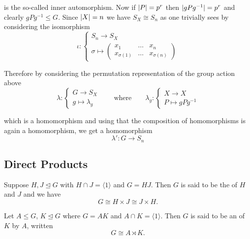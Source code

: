 	\noindent is the so-called inner automorphism. Now if $\abs[0]{P} = p^r$ then $\abs[0]{gPg^{-1}} = p^r$ and clearly $gPg^{-1} \leq G$. Since $\abs[0]{X} = n$ we have $S_X \cong S_n$ as one trivially sees by considering the isomorphism 
	\begin{equation}
		\iota:\begin{cases} S_n \to S_X\\
			\sigma \mapsto \begin{pmatrix}x_1 & \dots & x_n\\
				x_{\sigma(1)} & \dots & x_{\sigma(n)}
			\end{pmatrix}
		\end{cases}
	\end{equation}

	Therefore by considering the permutation representation of the group action above 
	\begin{equation}
		\lambda:\begin{cases}
			G \to S_X\\
			g \mapsto \lambda_g
		\end{cases}
		\qquad
		\text{where} 
		\qquad 
		\lambda_g:\begin{cases}
			X \to X\\
			P \mapsto gPg^{-1}
		\end{cases}
	\end{equation}

	\noindent which is a homomorphism and using that the composition of homomorphisms is again a homomorphism, we get a homomorphism 
	\begin{equation}
		\lambda': G \to S_n
	\end{equation}

\subsection{Direct Products}

\begin{definition}
	Suppose $H,J \unlhd G$ with $H \cap J = \langle 1 \rangle$ and $G = HJ$. Then $G$ is said to be the  of $H$ and $J$ and we have 
	\begin{equation}
		G \cong H \times J \cong J \times H.
	\end{equation}
\end{definition}

\begin{definition}
	Let $A \leq G$, $K \unlhd G$ where $G = AK$ and $A \cap K = \langle 1 \rangle$. Then $G$ is said to be an  of $K$ by $A$, written 
	\begin{equation}
		G \cong A \rtimes K.
	\end{equation}
\end{definition}
